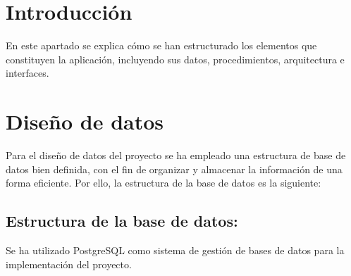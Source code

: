 
\section{Introducción}
En este apartado se explica cómo se han estructurado los elementos que constituyen la aplicación, incluyendo sus datos, procedimientos, arquitectura e interfaces.

\section{Diseño de datos}
Para el diseño de datos del proyecto se ha empleado una estructura de base de datos bien definida, con el fin de organizar y almacenar la información de una forma eficiente. Por ello, la estructura de la base de datos es la siguiente:

\subsection{Estructura de la base de datos:}
Se ha utilizado PostgreSQL como sistema de gestión de bases de datos para la implementación del proyecto. 

